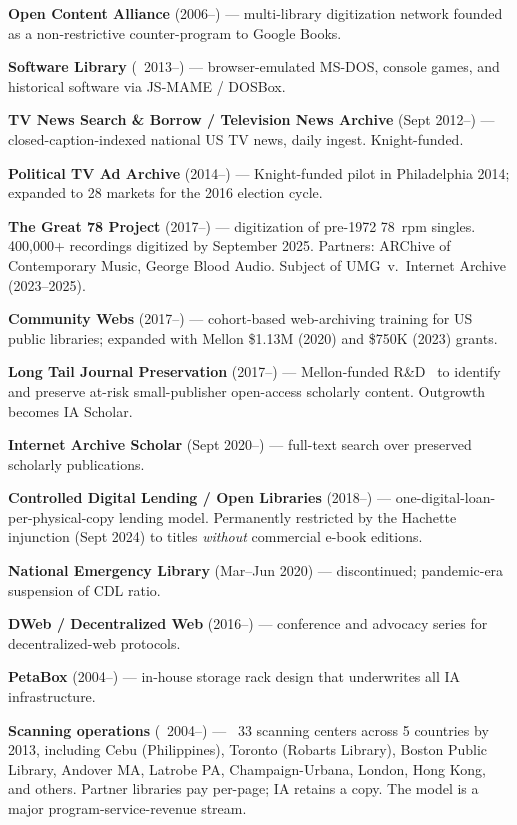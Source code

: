\documentclass[10pt,letterpaper,twocolumn]{article}
\begin{document}
\textbf{Open Content Alliance} (2006--) --- multi-library digitization network founded as a non-restrictive counter-program to Google Books.

\textbf{Software Library} (~2013--) --- browser-emulated MS-DOS, console games, and historical software via JS-MAME / DOSBox.

\textbf{TV News Search \& Borrow / Television News Archive} (Sept 2012--) --- closed-caption-indexed national US TV news, daily ingest. Knight-funded.

\textbf{Political TV Ad Archive} (2014--) --- Knight-funded pilot in Philadelphia 2014; expanded to 28 markets for the 2016 election cycle.

\textbf{The Great 78 Project} (2017--) --- digitization of pre-1972 78~rpm singles. 400{,}000+ recordings digitized by September 2025. Partners: ARChive of Contemporary Music, George Blood Audio. Subject of UMG~v.~Internet Archive (2023--2025).

\textbf{Community Webs} (2017--) --- cohort-based web-archiving training for US public libraries; expanded with Mellon \$1.13M (2020) and \$750K (2023) grants.

\textbf{Long Tail Journal Preservation} (2017--) --- Mellon-funded R\&D~\citep{ialongtail2018} to identify and preserve at-risk small-publisher open-access scholarly content. Outgrowth becomes IA Scholar.

\textbf{Internet Archive Scholar} (Sept 2020--) --- full-text search over preserved scholarly publications.

\textbf{Controlled Digital Lending / Open Libraries} (2018--) --- one-digital-loan-per-physical-copy lending model. Permanently restricted by the Hachette injunction (Sept 2024) to titles \emph{without} commercial e-book editions.

\textbf{National Emergency Library} (Mar--Jun 2020) --- discontinued; pandemic-era suspension of CDL ratio.

\textbf{DWeb / Decentralized Web} (2016--) --- conference and advocacy series for decentralized-web protocols.

\textbf{PetaBox} (2004--) --- in-house storage rack design that underwrites all IA infrastructure.

\textbf{Scanning operations} (~2004--) --- ~33 scanning centers across 5 countries by 2013, including Cebu (Philippines), Toronto (Robarts Library), Boston Public Library, Andover MA, Latrobe PA, Champaign-Urbana, London, Hong Kong, and others. Partner libraries pay per-page; IA retains a copy. The model is a major program-service-revenue stream.
\end{document}
